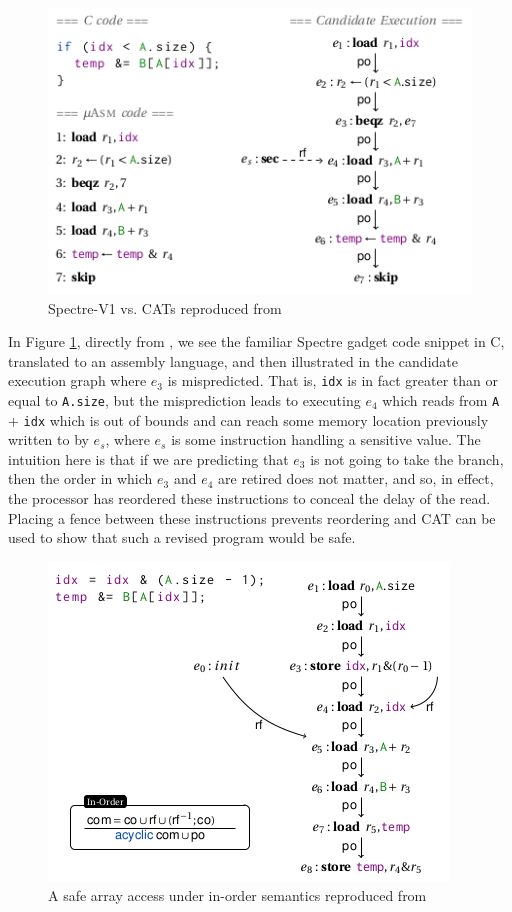 \documentclass[11pt,conference]{IEEEtran}
\begin{document}
\begin{figure}[t]
  \centering
  \includegraphics[width=0.9\linewidth]{cats1}
	\caption{Spectre-V1 vs. CATs reproduced from \cite{cats2022}}
  \label{fig:cats1}
\end{figure}

In Figure \ref{fig:cats1}, directly from \cite{cats2022}, we see the familiar Spectre gadget code snippet in C, translated to an assembly language, and then illustrated in the candidate execution graph where $e_3$ is mispredicted.
That is, \texttt{idx} is in fact greater than or equal to \texttt{A.size}, but the misprediction leads to executing $e_4$ which reads from \texttt{A} + \texttt{idx} which is out of bounds and can reach some memory location previously written to by $e_s$, where $e_s$ is some instruction handling a sensitive value.
The intuition here is that if we are predicting that $e_3$ is not going to take the branch, then the order in which $e_3$ and $e_4$ are retired does not matter, and so, in effect, the processor has reordered these instructions to conceal the delay of the read.
Placing a fence between these instructions prevents reordering and CAT can be used to show that such a revised program would be safe.

\begin{figure}[t]
  \centering
  \includegraphics[width=0.9\linewidth]{cats2}
	\caption{A safe array access under in-order semantics reproduced from \cite{cats2022}}
  \label{fig:cats2}
\end{figure}
\end{document}
